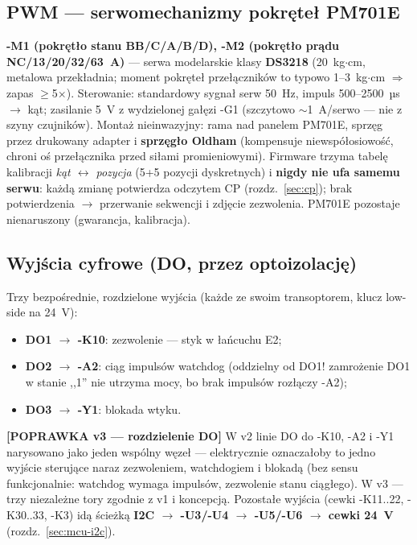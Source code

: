 \documentclass[11pt,a4paper]{article}
\newcommand{\popr}[1]{\textbf{\color{granat}[POPRAWKA v3 --- #1]}}
\begin{document}
\subsection{PWM --- serwomechanizmy pokręteł PM701E}
\label{sec:serwa}
\textbf{-M1 (pokrętło stanu BB/C/A/B/D), -M2 (pokrętło prądu NC/13/20/32/63~A)} --- serwa
modelarskie klasy \textbf{DS3218} (20~kg$\cdot$cm, metalowa przekładnia; moment pokręteł
przełączników to typowo 1--3~kg$\cdot$cm $\Rightarrow$ zapas $\ge$5$\times$). Sterowanie:
standardowy sygnał serw 50~Hz, impuls 500--2500~µs $\to$ kąt; zasilanie 5~V z wydzielonej
gałęzi -G1 (szczytowo $\sim$1~A/serwo --- nie z szyny czujników). Montaż nieinwazyjny: rama nad
panelem PM701E, sprzęg przez drukowany adapter i \textbf{sprzęgło Oldham} (kompensuje
niewspółosiowość, chroni oś przełącznika przed siłami promieniowymi). Firmware trzyma tabelę
kalibracji \emph{kąt $\leftrightarrow$ pozycja} (5+5 pozycji dyskretnych) i \textbf{nigdy nie ufa
samemu serwu}: każdą zmianę potwierdza odczytem CP (rozdz.~\ref{sec:cp}); brak potwierdzenia
$\to$ przerwanie sekwencji i zdjęcie zezwolenia. PM701E pozostaje nienaruszony (gwarancja,
kalibracja).

\subsection{Wyjścia cyfrowe (DO, przez optoizolację)}
\label{sec:do}
Trzy bezpośrednie, rozdzielone wyjścia (każde ze swoim transoptorem, klucz low-side na 24~V):
\begin{itemize}
\item \textbf{DO1 $\to$ -K10}: zezwolenie --- styk w łańcuchu E2;
\item \textbf{DO2 $\to$ -A2}: ciąg impulsów watchdog (oddzielny od DO1! zamrożenie DO1
w stanie ,,1'' nie utrzyma mocy, bo brak impulsów rozłączy -A2);
\item \textbf{DO3 $\to$ -Y1}: blokada wtyku.
\end{itemize}
\popr{rozdzielenie DO} W v2 linie DO do -K10, -A2 i -Y1 narysowano jako jeden wspólny węzeł ---
elektrycznie oznaczałoby to jedno wyjście sterujące naraz zezwoleniem, watchdogiem i blokadą
(bez sensu funkcjonalnie: watchdog wymaga impulsów, zezwolenie stanu ciągłego). W v3 ---
trzy niezależne tory zgodnie z v1 i koncepcją.
Pozostałe wyjścia (cewki -K11..22, -K30..33, -K3) idą ścieżką
\textbf{I2C $\to$ -U3/-U4 $\to$ -U5/-U6 $\to$ cewki 24~V} (rozdz.~\ref{sec:mcu-i2c}).
\end{document}
